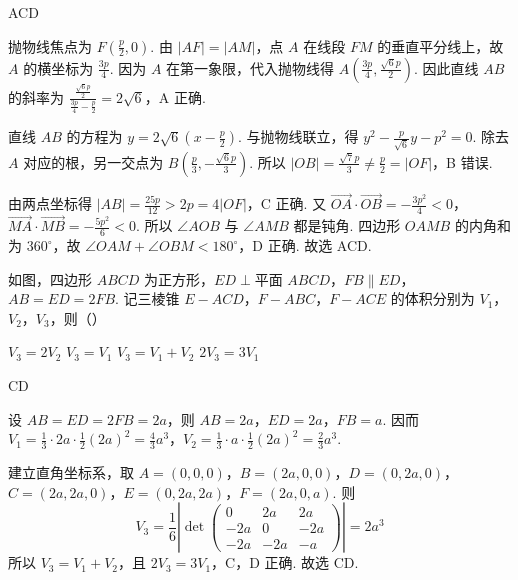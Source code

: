 \begin{answer}
ACD
\end{answer}

\begin{solution}
抛物线焦点为 \(F\left(\frac p2,0\right)\). 由 \(|AF|=|AM|\)，点 \(A\) 在线段 \(FM\) 的垂直平分线上，故 \(A\) 的横坐标为 \(\frac{3p}{4}\). 因为 \(A\) 在第一象限，代入抛物线得
\(A\left(\frac{3p}{4},\frac{\sqrt6p}{2}\right)\). 因此直线 \(AB\) 的斜率为
\(\frac{\frac{\sqrt6p}{2}}{\frac{3p}{4}-\frac p2}=2\sqrt6\)，A 正确.

直线 \(AB\) 的方程为 \(y=2\sqrt6\left(x-\frac p2\right)\). 与抛物线联立，得
\(y^2-\frac p{\sqrt6}y-p^2=0\). 除去 \(A\) 对应的根，另一交点为
\(B\left(\frac p3,-\frac{\sqrt6p}{3}\right)\). 所以
\(|OB|=\frac{\sqrt7p}{3}\ne\frac p2=|OF|\)，B 错误.

由两点坐标得 \(|AB|=\frac{25p}{12}>2p=4|OF|\)，C 正确. 又
\(\overrightarrow{OA}\cdot\overrightarrow{OB}=-\frac{3p^2}{4}<0\)，\(\overrightarrow{MA}\cdot\overrightarrow{MB}=-\frac{5p^2}{6}<0\).
所以 \(\angle AOB\) 与 \(\angle AMB\) 都是钝角. 四边形 \(OAMB\) 的内角和为 \(360^\circ\)，故
\(\angle OAM+\angle OBM<180^\circ\)，D 正确.
故选 ACD.
\end{solution}


\begin{problem}
如图，四边形 \(ABCD\) 为正方形，\(ED\perp\text{平面 }ABCD\)，\(FB\parallel ED\)，\(AB=ED=2FB\). 记三棱锥 \(E-ACD\)，\(F-ABC\)，\(F-ACE\) 的体积分别为 \(V_1\)，\(V_2\)，\(V_3\)，则（\quad）


\choices
    {\(V_3=2V_2\)}
    {\(V_3=V_1\)}
    {\(V_3=V_1+V_2\)}
    {\(2V_3=3V_1\)}
\end{problem}

\begin{answer}
CD
\end{answer}

\begin{solution}
设 \(AB=ED=2FB=2a\)，则 \(AB=2a\)，\(ED=2a\)，\(FB=a\). 因而
\(V_1=\frac13\cdot2a\cdot\frac12(2a)^2=\frac43a^3\)，\(V_2=\frac13\cdot a\cdot\frac12(2a)^2=\frac23a^3\).

建立直角坐标系，取
\(A=(0,0,0)\)，\(B=(2a,0,0)\)，\(D=(0,2a,0)\)，\(C=(2a,2a,0)\)，\(E=(0,2a,2a)\)，\(F=(2a,0,a)\). 则
\[
V_3=\frac16\left|\det\begin{pmatrix}
0&2a&2a\\
-2a&0&-2a\\
-2a&-2a&-a
\end{pmatrix}\right|=2a^3
\]
所以 \(V_3=V_1+V_2\)，且 \(2V_3=3V_1\)，C，D 正确.
故选 CD.
\end{solution}


